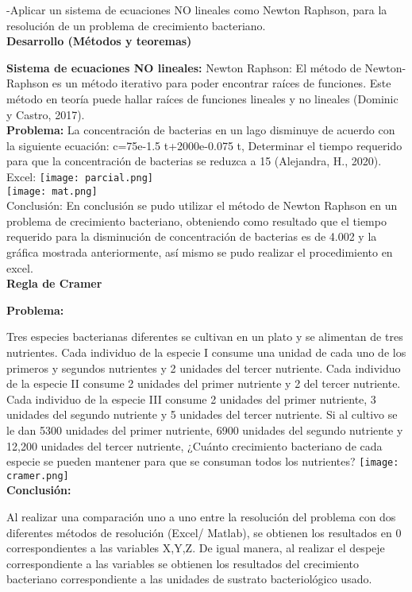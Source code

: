 \documentclass[12pt,a4paper]{article}
\begin{document}
-Aplicar un sistema de ecuaciones NO lineales como Newton Raphson, para la resolución de un problema de crecimiento bacteriano.\\


\textbf{Desarrollo (Métodos y teoremas)}

\textbf{Sistema de ecuaciones NO lineales:}
Newton Raphson: El método de Newton-Raphson es un método iterativo para poder encontrar raíces de funciones. Este método en teoría puede hallar raíces de funciones lineales y no lineales (Dominic y Castro, 2017).\\

\textbf{Problema:} La concentración de bacterias en un lago disminuye de acuerdo con la siguiente ecuación: c=75e-1.5 t+2000e-0.075 t, Determinar el tiempo requerido para que la concentración de bacterias se reduzca a 15 (Alejandra, H., 2020).\\

Excel:
\texttt{[image: parcial.png]}\\
\texttt{[image: mat.png]}\\
Conclusión:
En conclusión se pudo utilizar el método de Newton Raphson en un problema de crecimiento bacteriano, obteniendo como resultado que el tiempo requerido para la disminución de concentración de bacterias es de 4.002 y la gráfica mostrada anteriormente, así mismo se pudo realizar el procedimiento en excel. \\


\textbf{Regla de Cramer }

\textbf{Problema:}

Tres especies bacterianas diferentes se cultivan en un plato y se alimentan de tres nutrientes. Cada individuo de la especie I consume una unidad de cada uno de los primeros y segundos nutrientes y 2 unidades del tercer nutriente. Cada individuo de la especie II consume 2 unidades del primer nutriente y 2 del tercer nutriente. Cada individuo de la especie III consume 2 unidades del primer nutriente, 3 unidades del segundo nutriente y 5 unidades del tercer nutriente. Si al cultivo se le dan 5300 unidades del primer nutriente, 6900 unidades del segundo nutriente y 12,200 unidades del tercer nutriente, ¿Cuánto crecimiento bacteriano de cada especie se pueden mantener para que se consuman todos los nutrientes?
\texttt{[image: cramer.png]}\\

\textbf{Conclusión:}

Al realizar una comparación uno a uno entre la resolución del problema con dos diferentes métodos de resolución (Excel/ Matlab), se obtienen los resultados en 0 correspondientes a las variables X,Y,Z. De igual manera, al realizar el despeje correspondiente a las variables se obtienen los resultados del crecimiento bacteriano correspondiente a las unidades de sustrato bacteriológico usado.\\
\end{document}
